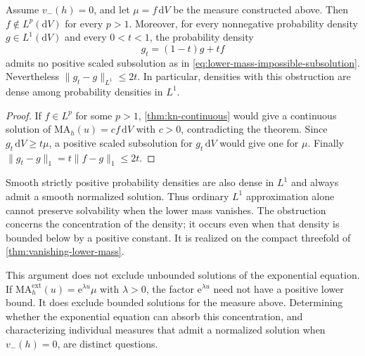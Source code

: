 \begin{corollary}\label{cor:lower-mass-lone-instability}
Assume $v_-(h)=0$, and let $\mu=f\,\mathrm{d}V$ be the measure constructed above. Then $f\notin L^p(\mathrm{d}V)$ for every $p>1$. Moreover, for every nonnegative probability density $g\in L^1(\mathrm{d}V)$ and every $0<t<1$, the probability density
\[
 g_t=(1-t)g+tf
\]
admits no positive scaled subsolution as in \eqref{eq:lower-mass-impossible-subsolution}. Nevertheless $\|g_t-g\|_{L^1}\leq2t$. In particular, densities with this obstruction are dense among probability densities in $L^1$.
\end{corollary}
\begin{proof}
If $f\in L^p$ for some $p>1$, \cref{thm:kn-continuous} would give a continuous solution of $\mathrm{MA}_h(u)=cf\,\mathrm{d}V$ with $c>0$, contradicting the theorem. Since $g_t\,\mathrm{d}V\geq t\mu$, a positive scaled subsolution for $g_t\,\mathrm{d}V$ would give one for $\mu$. Finally
$\|g_t-g\|_1=t\|f-g\|_1\leq2t$.
\end{proof}

Smooth strictly positive probability densities are also dense in $L^1$ and always admit a smooth normalized solution. Thus ordinary $L^1$ approximation alone cannot preserve solvability when the lower mass vanishes. The obstruction concerns the concentration of the density; it occurs even when that density is bounded below by a positive constant. It is realized on the compact threefold of \cref{thm:vanishing-lower-mass}.

This argument does not exclude unbounded solutions of the exponential equation. If $\mathrm{MA}^{\mathrm{ext}}_h(u)=\mathrm{e}^{\lambda u}\mu$ with $\lambda>0$, the factor $\mathrm{e}^{\lambda u}$ need not have a positive lower bound. It does exclude bounded solutions for the measure above. Determining whether the exponential equation can absorb this concentration, and characterizing individual measures that admit a normalized solution when $v_-(h)=0$, are distinct questions.
